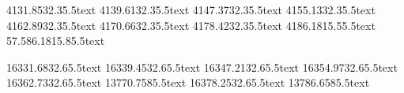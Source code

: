          {41}{31.85}{32.3}{5.5}{text}
   {41}{39.61}{32.3}{5.5}{text}
      {41}{47.37}{32.3}{5.5}{text}
 {41}{55.13}{32.3}{5.5}{text}
        {41}{62.89}{32.3}{5.5}{text}
    {41}{70.66}{32.3}{5.5}{text}
   {41}{78.42}{32.3}{5.5}{text}
      {41}{86.18}{15.5}{5.5}{text}
      {57.5}{86.18}{15.8}{5.5}{text}

   {163}{31.68}{32.6}{5.5}{text}
       {163}{39.45}{32.6}{5.5}{text}
 {163}{47.21}{32.6}{5.5}{text}
    {163}{54.97}{32.6}{5.5}{text}
      {163}{62.73}{32.6}{5.5}{text}
  {137}{70.7}{58}{5.5}{text}
  {163}{78.25}{32.6}{5.5}{text}
  {137}{86.6}{58}{5.5}{text}

\newcommand{\eigenschaftsleiste}[2]{%
  \zaehltnicht{s#1_mu}
  \zaehltnicht{s#1_kl}
  \zaehltnicht{s#1_in}
  \zaehltnicht{s#1_ch}
  \zaehltnicht{s#1_ff}
  \zaehltnicht{s#1_ge}
  \zaehltnicht{s#1_ko}
  \zaehltnicht{s#1_kk}
  \feld{#1}{s#1_mu}{27.35}{#2}{18}{6}{zahl}
  \feld{#1}{s#1_kl}{47.15}{#2}{18}{6}{zahl}
  \feld{#1}{s#1_in}{67.25}{#2}{18}{6}{zahl}
  \feld{#1}{s#1_ch}{86.75}{#2}{18}{6}{zahl}
  \feld{#1}{s#1_ff}{105.65}{#2}{18}{6}{zahl}
  \feld{#1}{s#1_ge}{125.05}{#2}{18}{6}{zahl}
  \feld{#1}{s#1_ko}{144.95}{#2}{18}{6}{zahl}
  \feld{#1}{s#1_kk}{164.8}{#2}{18}{6}{zahl}}

